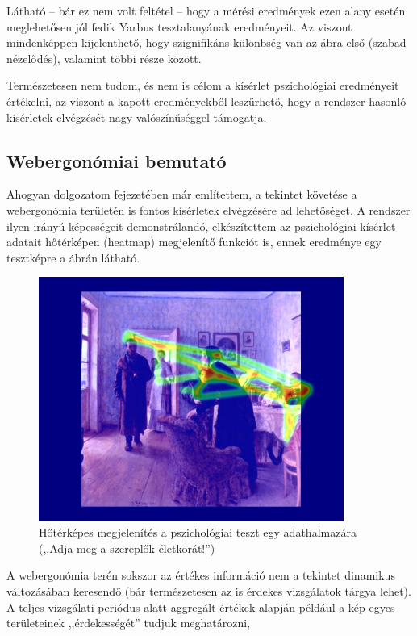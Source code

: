 Látható -- bár ez nem volt feltétel -- hogy a mérési eredmények ezen alany esetén meglehetősen jól fedik Yarbus tesztalanyának eredményeit. Az viszont mindenképpen kijelenthető, hogy szignifikáns különbség van az ábra első (szabad nézelődés), valamint többi része között.

Természetesen nem tudom, és nem is célom a kísérlet pszichológiai eredményeit értékelni, az viszont a kapott eredményekből leszűrhető, hogy a rendszer hasonló kísérletek elvégzését nagy valószínűséggel támogatja.

\subsection{Webergonómiai bemutató}\label{sect:web}

Ahogyan dolgozatom  fejezetében már említettem, a tekintet követése a webergonómia területén is fontos kísérletek elvégzésére ad lehetőséget. A rendszer ilyen irányú képességeit demonstrálandó, elkészítettem az pszichológiai kísérlet adatait hőtérképen (heatmap) megjelenítő funkciót is, ennek eredménye egy tesztképre a  ábrán látható.

\begin{figure}[!ht]
\centering
\includegraphics[width=100mm, keepaspectratio]{figures/heatmap.jpg}
\caption{Hőtérképes megjelenítés a pszichológiai teszt egy adathalmazára (,,Adja meg a szereplők életkorát!'')}
\label{fig:heatmap}
\end{figure}

A webergonómia terén sokszor az értékes információ nem a tekintet dinamikus változásában keresendő (bár természetesen az is érdekes vizsgálatok tárgya lehet). A teljes vizsgálati periódus alatt aggregált értékek alapján például a kép egyes területeinek ,,érdekességét'' tudjuk meghatározni, 

